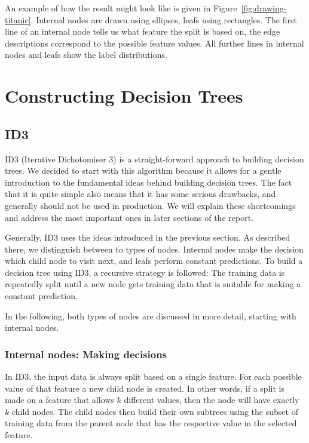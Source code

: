 \documentclass[a4paper]{article}
\begin{document}
An example of how the result might look like is given in Figure~\ref{fig:drawing-titanic}. Internal nodes are drawn using ellipses, leafs using rectangles. The first line of an internal node tells us what feature the split is based on, the edge descriptions correspond to the possible feature values. All further lines in internal nodes and leafs show the label distributions.

\section{Constructing Decision Trees}

\subsection{ID3}

ID3 (Iterative Dichotomiser 3) \cite{mitchell1997machine, quinlan1986induction} is a straight-forward approach to building decision trees. We decided to start with this algorithm because it allows for a gentle introduction to the fundamental ideas behind building decision trees.
The fact that it is quite simple also means that it has some serious drawbacks, and generally should not be used in production. We will explain these shortcomings and address the most important ones in later sections of the report.

Generally, ID3 uses the ideas introduced in the previous section.
As described there, we distinguish between to types of nodes. Internal nodes make the decision which child node to visit next, and leafs perform constant predictions.
To build a decision tree using ID3, a recursive strategy is followed: The training data is repeatedly split until a new node gets training data that is suitable for making a constant prediction.

In the following, both types of nodes are discussed in more detail, starting with internal nodes.

\subsubsection{Internal nodes: Making decisions}

In ID3, the input data is always split based on a single feature. For each possible value of that feature a new child node is created.
In other words, if a split is made on a feature that allows $k$ different values, then the node will have exactly $k$ child nodes.
The child nodes then build their own subtrees using the subset of training data from the parent node that has the respective value in the selected feature.
\end{document}
